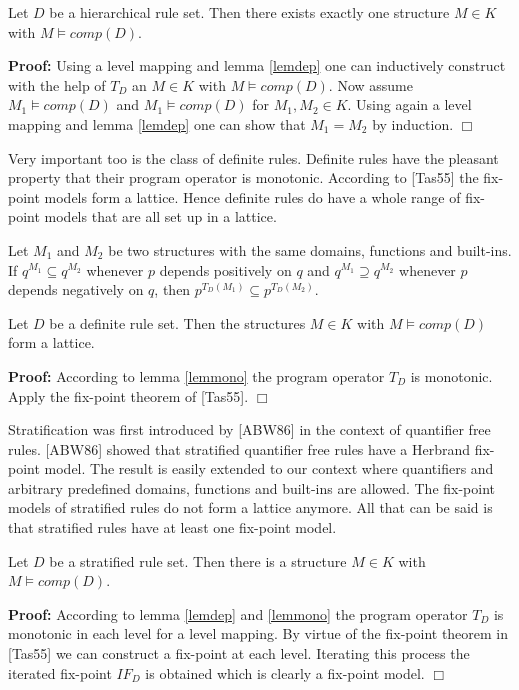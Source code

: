 \begin{Pro} Let $D$ be a hierarchical rule set. Then there exists exactly one structure
$M \in K$ with $M \models comp(D)$.
\end{Pro}

{\bf Proof:} Using a level mapping and lemma \ref{lemdep} one can inductively construct with the
help of $T_D$ an $M \in K$ with $M \models comp(D)$. Now assume $M_1 \models comp(D)$ and $M_1 
\models comp(D)$ for $M_1, M_2 \in K$. Using again a level mapping and lemma \ref{lemdep} one can 
show that $M_1=M_2$ by induction. \hfill $\Box$

Very important too is the class of definite rules. Definite rules have the pleasant property that 
their program operator is monotonic. According to [Tas55] the fix-point models form a lattice. 
Hence definite rules do have a whole range of fix-point models that are all set up in a lattice.

\begin{Lem}
\label{lemmono}
Let $M_1$ and $M_2$ be two structures with the same domains, functions and built-ins. If
$q^{M_1} \subseteq q^{M_2}$ whenever $p$ depends positively on $q$ and  $q^{M_1} \supseteq 
q^{M_2}$ whenever $p$ depends negatively on $q$, then $p^{T_D(M_1)} \subseteq p^{T_D(M_2)}$.
\end{Lem}

\begin{Pro} Let $D$ be a definite rule set. Then the structures $M \in K$ with 
$M \models comp(D)$ form a lattice.
\end{Pro}

{\bf Proof:} According to lemma \ref{lemmono} the program operator $T_D$ is monotonic. Apply
the fix-point theorem of [Tas55]. \hfill $\Box$

Stratification was first introduced by [ABW86] in the context of quantifier free rules.
[ABW86] showed that stratified quantifier free rules have a Herbrand fix-point model.
The result is easily extended to our context where quantifiers and arbitrary predefined domains, 
functions and built-ins are allowed. The fix-point models of stratified rules do not form
a lattice anymore. All that can be said is that stratified rules have at least one fix-point
model.

\begin{Pro} Let $D$ be a stratified rule set. Then there is a structure $M \in K$ with
$M \models comp(D)$.
\end{Pro}

{\bf Proof:} According to lemma \ref{lemdep} and \ref{lemmono} the program operator $T_D$
is monotonic in each level for a level mapping. By virtue of the fix-point theorem in
[Tas55] we can construct a fix-point at each level. Iterating this process the iterated
fix-point $IF_D$ is obtained which is clearly a fix-point model. \hfill $\Box$

